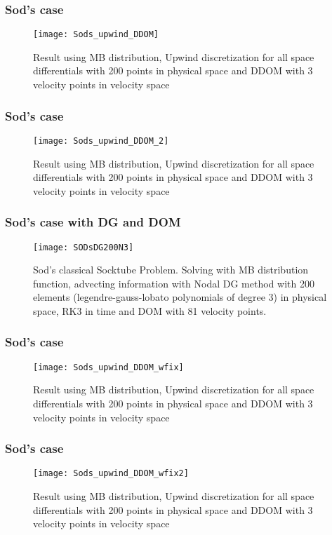 \begin{frame}
	\frametitle{Sod's case}
		
		\begin{figure}
			\centering
				\texttt{[image: Sods\_upwind\_DDOM]}
			\caption{Result using MB distribution, Upwind discretization for all space differentials with 200 points in physical space and DDOM with 3 velocity points in velocity space}
			\label{fig:MB_Sod_DDOM}
		\end{figure}
		
\end{frame}

\begin{frame}
	\frametitle{Sod's case}
		
		\begin{figure}
			\centering
				\texttt{[image: Sods\_upwind\_DDOM\_2]}
			\caption{Result using MB distribution, Upwind discretization for all space differentials with 200 points in physical space and DDOM with 3 velocity points in velocity space}
			\label{fig:MB_Sod_DDOM2}
		\end{figure}
		
\end{frame}

\begin{frame}
	\frametitle{Sod's case with DG and DOM}
			
		\begin{figure}
			\centering
				\texttt{[image: SODsDG200N3]}
			\caption{Sod's classical Socktube Problem. Solving with MB distribution function, advecting information with Nodal DG method with 200 elements (legendre-gauss-lobato polynomials of degree 3) in physical space, RK3 in time and DOM with 81 velocity points.}
			\label{fig:SODsDG200N3}
		\end{figure}
	
\end{frame}

\begin{frame}
	\frametitle{Sod's case}
		
		\begin{figure}
			\centering
				\texttt{[image: Sods\_upwind\_DDOM\_wfix]}
			\caption{Result using MB distribution, Upwind discretization for all space differentials with 200 points in physical space and DDOM with 3 velocity points in velocity space}
			\label{fig:MB_Sods_DDOM_wfix}
		\end{figure}
		
\end{frame}

\begin{frame}
	\frametitle{Sod's case}
		
		\begin{figure}
			\centering
				\texttt{[image: Sods\_upwind\_DDOM\_wfix2]}
			\caption{Result using MB distribution, Upwind discretization for all space differentials with 200 points in physical space and DDOM with 3 velocity points in velocity space}
			\label{fig:MB_Sods_DDOM_wfix2}
		\end{figure}
		
\end{frame}